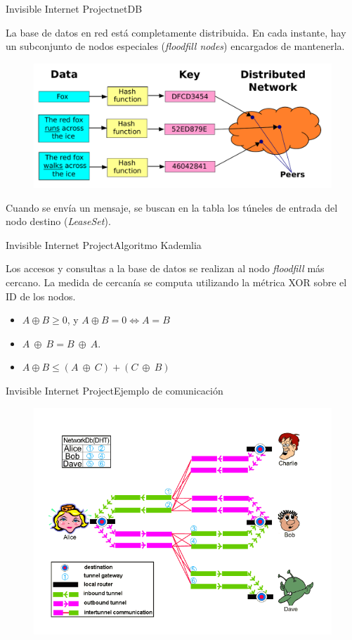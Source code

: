 \documentclass[spanish]{beamer}
\begin{document}
\begin{frame}{Invisible Internet Project}{netDB}

La base de datos en red está completamente distribuida. En cada instante, hay un subconjunto de nodos especiales (\textit{floodfill nodes}) encargados de mantenerla.\\

\begin{figure}
	\centering
	\includegraphics[width=.6\textwidth]{img/DHT.pdf}
\end{figure}

Cuando se envía un mensaje, se buscan en la tabla los túneles de entrada del nodo destino (\textit{LeaseSet}).
\end{frame}

\begin{frame}{Invisible Internet Project}{Algoritmo Kademlia}

Los accesos y consultas a la base de datos se realizan al nodo \textit{floodfill} más cercano. La medida de cercanía se computa utilizando la métrica XOR sobre el ID de los nodos.

\vspace{1.5em}
\begin{itemize}
	\item $A \oplus B \ge 0$, y $A \oplus B = 0 \iff A = B$ 
	\item $A \ \oplus \ B = B \ \oplus \ A$.
	\item $A \oplus B \leq (A \ \oplus \ C) + (C \ \oplus \ B)$
\end{itemize}
	
\end{frame}


\begin{frame}{Invisible Internet Project}{Ejemplo de comunicación}
\begin{figure}
	\centering
	\includegraphics[width=.8\textwidth]{img/alice_bob_message}
\end{figure}
	
\end{frame}
\end{document}

